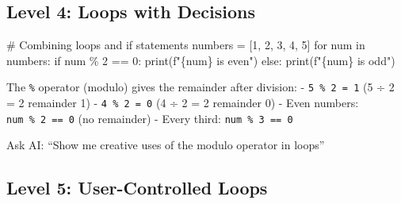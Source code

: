 \documentclass[
  letterpaper,
  DIV=11,
  numbers=noendperiod,
  oneside]{scrreprt}
\newenvironment{Shaded}{}{}
\newcommand{\BuiltInTok}[1]{\textcolor[rgb]{0.84,0.23,0.29}{#1}}
\newcommand{\CommentTok}[1]{\textcolor[rgb]{0.42,0.45,0.49}{#1}}
\newcommand{\ControlFlowTok}[1]{\textcolor[rgb]{0.84,0.23,0.29}{#1}}
\newcommand{\DecValTok}[1]{\textcolor[rgb]{0.00,0.36,0.77}{#1}}
\newcommand{\KeywordTok}[1]{\textcolor[rgb]{0.84,0.23,0.29}{#1}}
\newcommand{\NormalTok}[1]{\textcolor[rgb]{0.14,0.16,0.18}{#1}}
\newcommand{\OperatorTok}[1]{\textcolor[rgb]{0.14,0.16,0.18}{#1}}
\newcommand{\SpecialCharTok}[1]{\textcolor[rgb]{0.00,0.36,0.77}{#1}}
\newcommand{\SpecialStringTok}[1]{\textcolor[rgb]{0.01,0.18,0.38}{#1}}
\begin{document}
\subsection{Level 4: Loops with
Decisions}\label{level-4-loops-with-decisions}

\begin{Shaded}
\begin{Highlighting}[]
\CommentTok{\# Combining loops and if statements}
\NormalTok{numbers }\OperatorTok{=}\NormalTok{ [}\DecValTok{1}\NormalTok{, }\DecValTok{2}\NormalTok{, }\DecValTok{3}\NormalTok{, }\DecValTok{4}\NormalTok{, }\DecValTok{5}\NormalTok{]}
\ControlFlowTok{for}\NormalTok{ num }\KeywordTok{in}\NormalTok{ numbers:}
    \ControlFlowTok{if}\NormalTok{ num }\OperatorTok{\%} \DecValTok{2} \OperatorTok{==} \DecValTok{0}\NormalTok{:}
        \BuiltInTok{print}\NormalTok{(}\SpecialStringTok{f"}\SpecialCharTok{\{}\NormalTok{num}\SpecialCharTok{\}}\SpecialStringTok{ is even"}\NormalTok{)}
    \ControlFlowTok{else}\NormalTok{:}
        \BuiltInTok{print}\NormalTok{(}\SpecialStringTok{f"}\SpecialCharTok{\{}\NormalTok{num}\SpecialCharTok{\}}\SpecialStringTok{ is odd"}\NormalTok{)}
\end{Highlighting}
\end{Shaded}

\begin{tcolorbox}[enhanced jigsaw, opacityback=0, colback=white, colframe=quarto-callout-note-color-frame, breakable, titlerule=0mm, coltitle=black, rightrule=.15mm, colbacktitle=quarto-callout-note-color!10!white, left=2mm, bottomtitle=1mm, bottomrule=.15mm, title=\textcolor{quarto-callout-note-color}{\faInfo}\hspace{0.5em}{Expression Explorer: The Modulo Operator}, opacitybacktitle=0.6, toptitle=1mm, leftrule=.75mm, arc=.35mm, toprule=.15mm]

The \texttt{\%} operator (modulo) gives the remainder after division: -
\texttt{5\ \%\ 2\ =\ 1} (5 ÷ 2 = 2 remainder 1) -
\texttt{4\ \%\ 2\ =\ 0} (4 ÷ 2 = 2 remainder 0) - Even numbers:
\texttt{num\ \%\ 2\ ==\ 0} (no remainder) - Every third:
\texttt{num\ \%\ 3\ ==\ 0}

Ask AI: ``Show me creative uses of the modulo operator in loops''

\end{tcolorbox}

\subsection{Level 5: User-Controlled
Loops}\label{level-5-user-controlled-loops}
\end{document}
